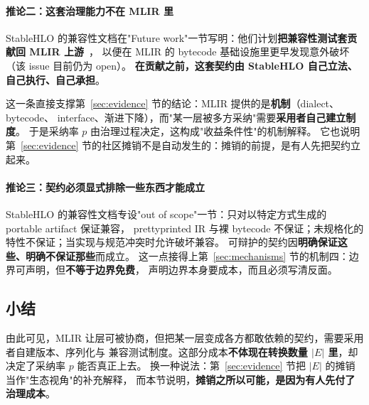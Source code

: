 \paragraph{推论二：这套治理能力不在 MLIR 里}
StableHLO 的兼容性文档在"Future work"一节写明：他们计划\textbf{把兼容性测试套贡献回 MLIR 上游}~\cite{stablehlocompat}，
以便在 MLIR 的 bytecode 基础设施里更早发现意外破坏（该 issue 目前仍为 open）。
\textbf{在贡献之前，这套契约由 StableHLO 自己立法、自己执行、自己承担}。

这一条直接支撑第~\ref{sec:evidence} 节的结论：MLIR 提供的是\textbf{机制}（dialect、bytecode、
interface、渐进下降），而"某一层被多方采纳"需要\textbf{采用者自己建立制度}。
于是采纳率 $p$ 由治理过程决定，这构成"收益条件性"的机制解释。
它也说明第~\ref{sec:evidence} 节的社区摊销不是自动发生的：摊销的前提，是有人先把契约立起来。

\paragraph{推论三：契约必须显式排除一些东西才能成立}
StableHLO 的兼容性文档专设"out of scope"一节：只对以特定方式生成的 portable artifact 保证兼容，
prettyprinted IR 与裸 bytecode 不保证；未规格化的特性不保证；当实现与规范冲突时允许破坏兼容。
可辩护的契约因\textbf{明确保证这些、明确不保证那些}而成立。
这一点接得上第~\ref{sec:mechanisms} 节的机制四：边界可声明，但\textbf{不等于边界免费}，
声明边界本身要成本，而且必须写清反面。

\subsection{小结}

由此可见，MLIR 让层可被协商，但把某一层变成各方都敢依赖的契约，需要采用者自建版本、序列化与
兼容测试制度。这部分成本\textbf{不体现在转换数量 $|E|$ 里}，却决定了采纳率 $p$ 能否真正上去。
换一种说法：第~\ref{sec:evidence} 节把 $|E|$ 的摊销当作"生态视角"的补充解释，
而本节说明，\textbf{摊销之所以可能，是因为有人先付了治理成本}。
